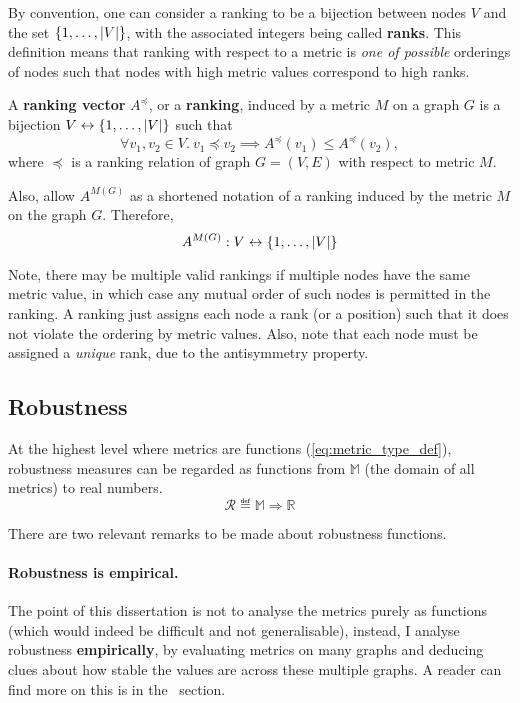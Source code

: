 By convention, one can consider a ranking to be a bijection between nodes $V$ and the set $\left\{1, \dots, \left\lvert V \right\rvert\right\}$, with the associated integers being called \textbf{ranks}.
This definition means that ranking with respect to a metric is \textsl{one of possible} orderings of nodes such that nodes with high metric values correspond to high ranks.

\begin{definition}
    \label{def:ranking_vector}
    A \textbf{ranking vector} $A^{\preceq}$, or a \textbf{ranking}, induced by a metric $M$ on a graph $G$ is a bijection $V \leftrightarrow \left\{1, \dots, \left\lvert V \right\rvert\right\}$ such that
    \[ \forall v_1, v_2 \in V.\ v_1 \preceq v_2 \implies A^{\preceq}(v_1) \leq A^{\preceq}(v_2), \]
    where $\preceq$ is a ranking relation of graph $G = (V, E)$ with respect to metric $M$.

    Also, allow $A^{M(G)}$ as a shortened notation of a ranking induced by the metric $M$ on the graph $G$.
    Therefore,
    \[ A^{M(G)} : V \leftrightarrow \left\{1, \dots, \left\lvert V \right\rvert\right\} \]
\end{definition}

Note, there may be multiple valid rankings if multiple nodes have the same metric value, in which case any mutual order of such nodes is permitted in the ranking.
A ranking just assigns each node a rank (or a position) such that it does not violate the ordering by metric values.
Also, note that each node must be assigned a \textsl{unique} rank, due to the antisymmetry property.

\subsection{Robustness}

At the highest level where metrics are functions (\autoref{eq:metric_type_def}), robustness measures can be regarded as functions from $\mathbb{M}$ (the domain of all metrics) to real numbers.
\begin{equation}
    \mathcal{R} \eqdef \mathbb{M} \Rightarrow \mathbb{R}
\end{equation}

There are two relevant remarks to be made about robustness functions.

\paragraph*{Robustness is empirical.} The point of this dissertation is not to analyse the metrics purely as functions (which would indeed be difficult and not generalisable), instead, I analyse robustness \textbf{empirically}, by evaluating metrics on many graphs and deducing clues about how stable the values are across these multiple graphs.
A reader can find more on this is in the~ section.

